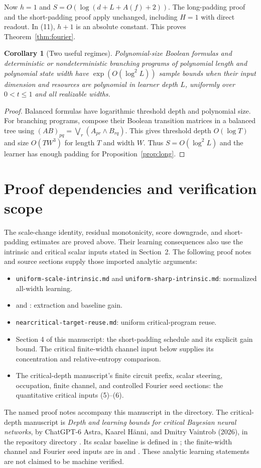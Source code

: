 \documentclass[11pt]{article}
\newtheorem{corollary}[theorem]{Corollary}
\theoremstyle{remark}\newtheorem{remark}[theorem]{Remark}
\begin{document}
Now $h=1$ and $S=O(\log(d+L+A(f)+2))$. The long-padding proof
and the short-padding proof apply unchanged, including $H=1$ with
direct readout. In (11), $h+1$ is an absolute constant. This proves
Theorem~\ref{thm:fourier}.

\begin{corollary}[Two useful regimes]
Polynomial-size Boolean formulas and deterministic or nondeterministic branching programs
of polynomial length and polynomial state width have
$\exp(O(\log^2 L))$ sample bounds when their input dimension and
resources are polynomial in learner depth $L$, uniformly over
$0<t\le1$ and all realizable widths.
\end{corollary}
\begin{proof}
Balanced formulas have logarithmic threshold depth and polynomial
size. For branching programs, compose their Boolean transition
matrices in a balanced tree using
$(AB)_{pq}=\bigvee_r(A_{pr}\wedge B_{rq})$.
This gives threshold depth $O(\log T)$ and size $O(TW^3)$ for
length $T$ and width $W$. Thus $S=O(\log^2 L)$ and the learner
has enough padding for Proposition~\ref{prop:long}.
\end{proof}

\section*{Proof dependencies and verification scope}
The scale-change identity, residual monotonicity, score downgrade, and
short-padding estimates are proved above. Their learning consequences
also use the intrinsic and critical scalar inputs stated in Section~2.
The following proof notes and source sections supply those imported
analytic arguments:
\begin{itemize}
\item \texttt{uniform-scale-intrinsic.md} and
\texttt{uniform-sharp-intrinsic.md}: normalized all-width learning.
\item {} and
: extraction and baseline gain.
\item \texttt{nearcritical-target-reuse.md}: uniform critical-program reuse.
\item Section 4 of this manuscript: the short-padding schedule and
its explicit gain bound. The critical finite-width channel input below
supplies its concentration and relative-entropy comparison.
\item The critical-depth manuscript's finite circuit prefix,
scalar steering, occupation, finite channel, and controlled Fourier
seed sections: the quantitative critical inputs (5)--(6).
\end{itemize}
The named proof notes accompany this manuscript in the
 directory. The critical-depth manuscript is
\emph{Depth and learning bounds for critical Bayesian neural networks},
by ChatGPT-6 Astra, Kaarel H\"anni, and Dmitry Vaintrob (2026), in the
repository directory .
Its scalar baseline is defined in ;
the finite-width channel and Fourier seed inputs are in
 and
.
These analytic learning statements are not claimed to be machine verified.
\end{document}
